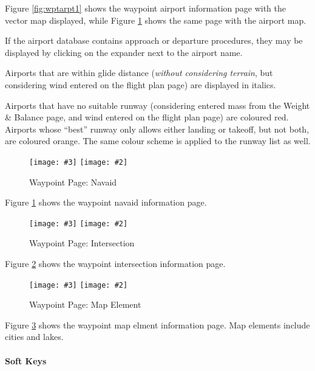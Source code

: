 \documentclass[a4paper,10pt,pdftex]{article}
\newcommand{\jnxfig}[3][]{\ifmypdf\texttt{[image: \#3]}
  \else\texttt{[image: \#2]}\fi}
\begin{document}
Figure \ref{fig:wptarpt1} shows the waypoint airport information page
with the vector map displayed, while Figure \ref{fig:wptnavaid} shows
the same page with the airport map.

If the airport database contains approach or departure procedures,
they may be displayed by clicking on the expander next to the airport
name.

Airports that are within glide distance (\emph{without considering
  terrain}, but considering wind entered on the flight plan page) are
displayed in italics.

Airports that have no suitable runway (considering entered mass from
the Weight \& Balance page, and wind entered on the flight plan page)
are coloured red. Airports whose ``best'' runway only allows either
landing or takeoff, but not both, are coloured orange. The same colour
scheme is applied to the runway list as well.

\begin{figure}[!htbp]
  \begin{center}
    \jnxfig[scale=0.5]{wptnavaid.eps}{wptnavaid.png}
    \caption{Waypoint Page: Navaid}
    \label{fig:wptnavaid}
  \end{center}
\end{figure}

Figure \ref{fig:wptnavaid} shows the waypoint navaid information
page.

\begin{figure}[!htbp]
  \begin{center}
    \jnxfig[scale=0.5]{wptint.eps}{wptint.png}
    \caption{Waypoint Page: Intersection}
    \label{fig:wptint}
  \end{center}
\end{figure}

Figure \ref{fig:wptint} shows the waypoint intersection information
page.

\begin{figure}[!htbp]
  \begin{center}
    \jnxfig[scale=0.5]{wptmapel.eps}{wptmapel.png}
    \caption{Waypoint Page: Map Element}
    \label{fig:wptmapel}
  \end{center}
\end{figure}

Figure \ref{fig:wptmapel} shows the waypoint map elment information
page. Map elements include cities and lakes.

\paragraph{Soft Keys}
\end{document}
